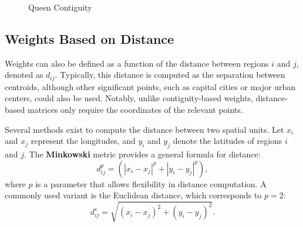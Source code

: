 \documentclass[english,12pt]{book}\usepackage[]{graphicx}\usepackage[]{xcolor}
\begin{document}
\begin{figure}[h]
\caption{Queen Contiguity}
\label{fig:Queen_cont_grid}
\centering
{}
\end{figure}


\subsection{Weights Based on Distance}

Weights can also be defined as a function of the distance between regions $i$ and $j$, denoted as $d_{ij}$. Typically, this distance is computed as the separation between centroids, although other significant points, such as capital cities or major urban centers, could also be used. Notably, unlike contiguity-based weights, distance-based matrices only require the coordinates of the relevant points.

Several methods exist to compute the distance between two spatial units. Let $x_i$ and $x_j$ represent the longitudes, and $y_i$ and $y_j$ denote the latitudes of regions $i$ and $j$. The \textbf{Minkowski} metric provides a general formula for distance:
\begin{equation*}
  d_{ij}^p = \left(\left|x_i - x_j\right|^p + \left|y_i - y_j\right|^p\right),
\end{equation*}
%
where $p$ is a parameter that allows flexibility in distance computation. A commonly used variant is the Euclidean distance, which corresponds to $p = 2$:
\begin{equation*}
  d_{ij}^e = \sqrt{(x_i - x_j)^2 + (y_i - y_j)^2}.
\end{equation*}
\end{document}
